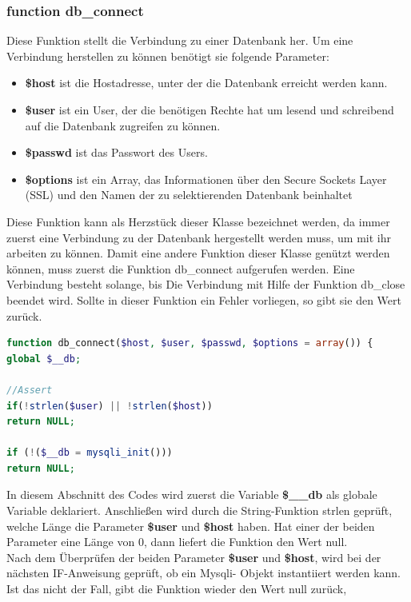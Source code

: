 \subsubsection{function db\_connect}
Diese Funktion stellt die Verbindung zu einer Datenbank her. Um eine Verbindung herstellen zu können benötigt sie folgende Parameter:
	\begin{itemize}
		\item \textbf{\$host} ist die Hostadresse, unter der die Datenbank erreicht werden kann.
		\item \textbf{\$user} ist ein User, der die benötigen Rechte hat um lesend und schreibend auf die Datenbank zugreifen zu können.
		\item \textbf{\$passwd} ist das Passwort des Users.
		\item \textbf{\$options} ist ein Array, das Informationen über den Secure Sockets Layer (SSL) und den Namen der zu selektierenden Datenbank beinhaltet
	\end{itemize}
Diese Funktion kann als Herzstück dieser Klasse bezeichnet werden, da immer zuerst eine Verbindung zu der Datenbank hergestellt werden muss, um mit ihr arbeiten zu können. Damit eine andere Funktion dieser Klasse genützt werden können, muss zuerst die Funktion db\_connect aufgerufen werden.
Eine Verbindung besteht solange, bis Die Verbindung mit Hilfe der Funktion db\_close beendet wird.
Sollte in dieser Funktion ein Fehler vorliegen, so gibt sie den Wert  zurück.
\newpage

\begin{lstlisting}[language=PHP, caption=mysqli.php/function-db\_connect1, firstnumber=21]
function db_connect($host, $user, $passwd, $options = array()) {
global $__db;

//Assert
if(!strlen($user) || !strlen($host))
return NULL;

if (!($__db = mysqli_init()))
return NULL;
\end{lstlisting}

In diesem Abschnitt des Codes wird zuerst die Variable \textbf{\$\_\_db} als globale Variable deklariert. Anschließen wird durch die String-Funktion strlen geprüft, welche Länge die Parameter \textbf{\$user} und \textbf{\$host} haben. Hat einer der beiden Parameter eine Länge von 0, dann liefert die Funktion den Wert null.\\
Nach dem Überprüfen der beiden Parameter \textbf{\$user} und \textbf{\$host}, wird bei der nächsten IF-Anweisung geprüft, ob ein Mysqli- Objekt instantiiert werden kann. Ist das nicht der Fall, gibt die Funktion wieder den Wert null zurück,

